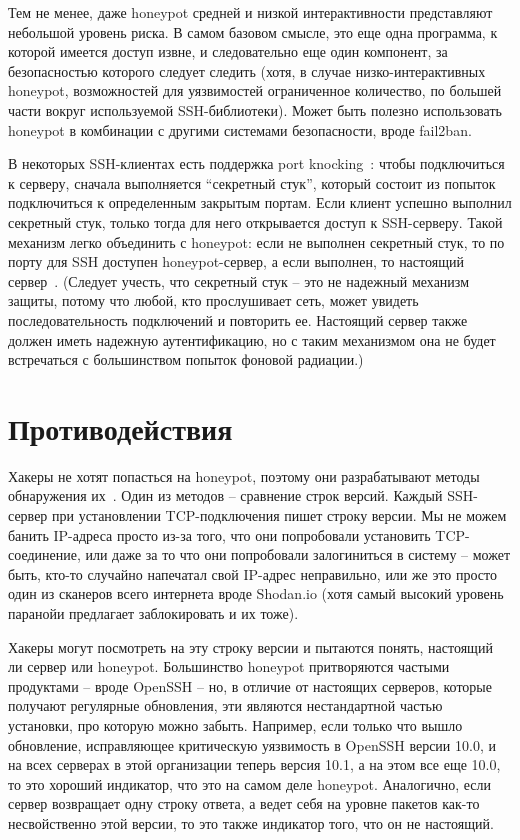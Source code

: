 \documentclass[a4page]{article}
\begin{document}
Тем не менее, даже honeypot средней и низкой интерактивности представляют небольшой уровень риска. В самом базовом смысле, это еще одна программа, к которой имеется доступ извне, и следовательно еще один компонент, за безопасностью которого следует следить (хотя, в случае низко-интерактивных honeypot, возможностей для уязвимостей ограниченное количество, по большей части вокруг используемой SSH-библиотеки). Может быть полезно использовать honeypot в комбинации с другими системами безопасности, вроде fail2ban.

В некоторых SSH-клиентах есть поддержка port knocking~\cite{port-knocking}: чтобы подключиться к серверу, сначала выполняется “секретный стук”, который состоит из попыток подключиться к определенным закрытым портам. Если клиент успешно выполнил секретный стук, только тогда для него открывается доступ к SSH-серверу. Такой механизм легко объединить с honeypot: если не выполнен секретный стук, то по порту для SSH доступен honeypot-сервер, а если выполнен, то настоящий сервер~\cite{paper:8528787}. (Следует учесть, что секретный стук – это не надежный механизм защиты, потому что любой, кто прослушивает сеть, может увидеть последовательность подключений и повторить ее. Настоящий сервер также должен иметь надежную аутентификацию, но с таким механизмом она не будет встречаться с большинством попыток фоновой радиации.)

\section{Противодействия}

Хакеры не хотят попасться на honeypot, поэтому они разрабатывают методы обнаружения их~\cite{paper:10082467}. Один из методов – сравнение строк версий. Каждый SSH-сервер при установлении TCP-подключения пишет строку версии. Мы не можем банить IP-адреса просто из-за того, что они попробовали установить TCP-соединение, или даже за то что они попробовали залогиниться в систему – может быть, кто-то случайно напечатал свой IP-адрес неправильно, или же это просто один из сканеров всего интернета вроде Shodan.io (хотя самый высокий уровень паранойи предлагает заблокировать и их тоже).

Хакеры могут посмотреть на эту строку версии и пытаются понять, настоящий ли сервер или honeypot. Большинство honeypot притворяются частыми продуктами – вроде OpenSSH – но, в отличие от настоящих серверов, которые получают регулярные обновления, эти являются нестандартной частью установки, про которую можно забыть. Например, если только что вышло обновление, исправляющее критическую уязвимость в OpenSSH версии 10.0, и на всех серверах в этой организации теперь версия 10.1, а на этом все еще 10.0, то это хороший индикатор, что это на самом деле honeypot. Аналогично, если сервер возвращает одну строку ответа, а ведет себя на уровне пакетов как-то несвойственно этой версии, то это также индикатор того, что он не настоящий. 
\end{document}
